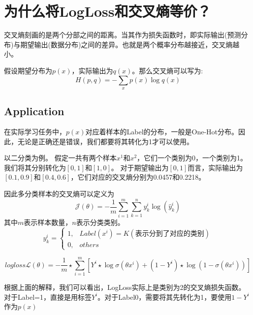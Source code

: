\documentclass{article}
\begin{document}
\section{为什么将LogLoss和交叉熵等价？}
交叉熵刻画的是两个分部之间的距离。当其作为损失函数时，即实际输出(预测分布)与期望输出(数据分布)之间的差异。也就是两个概率分布越接近，交叉熵越小。

假设期望分布为$p(x)$，实际输出为$q(x)$。那么交叉熵可以写为:
\begin{equation}
    H(p,q) = -\sum_{x} p(x) \log q(x)
\end{equation}


\subsection{Application}
在实际学习任务中，$p(x)$对应着样本的Label的分布，一般是One-Hot分布。因此，无论是正确还是错误，我们都要将其转化为1才可以使用。

以二分类为例。
假定一共有两个样本$x^1$和$x^2$，它们一个类别为0，一个类别为1。我们将其分别转化为$\left[0,1\right]$和$\left[1,0\right]$。
对于期望输出为$\left[0,1\right]$而言，实际输出为$\left[0.1, 0.9\right]$和$\left[0.4, 0.6\right]$，它们对应的交叉熵分别为0.0457和0.2218。


因此多分类样本的交叉熵可以定义为
\begin{equation}
    \mathcal{J}(\theta) = -\frac{1}{m} \sum^m_{i=1} \sum^n_{k=1} y_k^i \log (\hat{y}_k^i)
\end{equation}
其中$m$表示样本数量，$n$表示分类类别。
\begin{equation}
    y_k^i = \begin{cases}
        1,& Label(x^i)=K(\text{表示分到了对应的类别}) \\
        0,& others
    \end{cases}
\end{equation}

\begin{equation}
    logloss \mathcal{L}(\theta) = -\frac{1}{m} \star \sum^m_{i=1} \left[ Y^i \star \log \sigma(\theta x^i) + (1-Y^i) \star \log (1-\sigma(\theta x^i))  \right]
\end{equation}

根据上面的解释，我们可以看出，LogLoss实际上是类别为2的交叉熵损失函数。对于Label=1，直接是用标签$Y^i$。对于Label0，需要将其先转化为1，要使用$1-Y^i$作为$p(x)$



\end{document}
